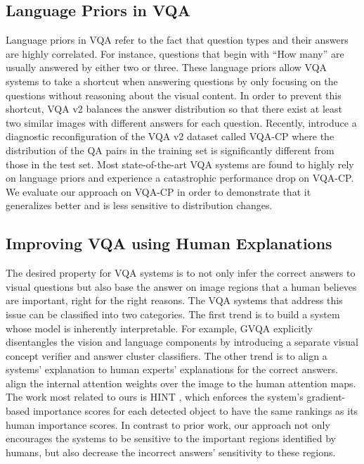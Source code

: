 \documentclass{article}
\begin{document}
\subsection{Language Priors in VQA}
Language priors \cite{vqa-cp,goyal2017making} in VQA refer to the fact that question types and their answers are highly correlated. For instance,  questions that begin with ``How many'' are usually answered by either two or three. These language priors allow VQA systems to take a shortcut when answering questions by only focusing on the questions without reasoning about the visual content. In order to prevent this shortcut, VQA v2 \cite{antol2015vqa} balances the answer distribution so that there exist at least two similar images with different answers for each question. Recently, \cite{vqa-cp} introduce a diagnostic reconfiguration of the VQA v2 dataset called VQA-CP where the distribution of the QA pairs in the training set is significantly different from those in the test set. Most state-of-the-art VQA systems are found to highly rely on language priors and experience a catastrophic performance drop on VQA-CP.  We evaluate our approach on VQA-CP in order to demonstrate that it generalizes better and is less sensitive to distribution changes.

\subsection{Improving VQA using Human Explanations}
The desired property for VQA systems is to not only infer the correct answers to visual questions but also base the answer on image regions that a human believes are important,  right for the right reasons. The VQA systems that address this issue can be classified into two categories. The first trend is to build a system whose model is inherently interpretable. For example, GVQA \cite{vqa-cp} explicitly disentangles the vision and language components by introducing a separate visual concept verifier and answer cluster classifiers. The other trend is to align a systems' explanation to human experts' explanations for the correct answers. \cite{zhang2019interpretable,qiao2018exploring} align the internal attention weights over the image to the human attention maps. The work most related to ours is HINT \cite{selvaraju2019taking}, which enforces the system's gradient-based importance scores for each detected object to have the same rankings as its human importance scores. In contrast to prior work, our approach not only encourages the systems to be sensitive to the important regions identified by humans, but also decrease the incorrect answers' sensitivity to these regions. 
\end{document}
